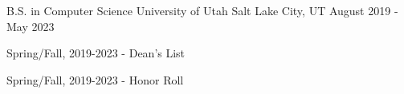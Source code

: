 


\begin{cventries}


\cventry
{B.S. in Computer Science} %
{University of Utah} %
{Salt Lake City, UT} %
{August 2019 - May 2023} %
{ %
\begin{cvitems}
\item {Spring/Fall, 2019-2023 - Dean's List}
\item {Spring/Fall, 2019-2023 - Honor Roll}
\end{cvitems}
}


\end{cventries}